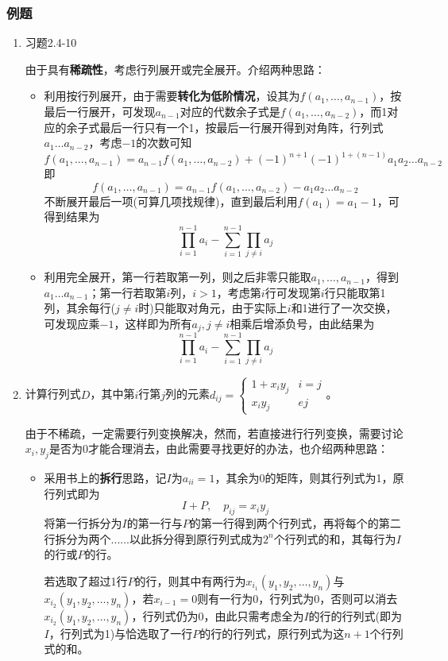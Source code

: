 \documentclass[a4paper,UTF8,fontset=windows]{ctexart}
\begin{document}
\subsubsection{例题}
\begin{enumerate}
    \item 习题2.4-10
    
    由于具有\textbf{稀疏性}，考虑行列展开或完全展开。介绍两种思路：
    \begin{itemize}
        \item 利用按行列展开，由于需要\textbf{转化为低阶情况}，设其为$f(a_1,\dots,a_{n-1})$，按最后一行展开，可发现$a_{n-1}$对应的代数余子式是$f(a_1,\dots,a_{n-2})$，而1对应的余子式最后一行只有一个1，按最后一行展开得到对角阵，行列式$a_1\dots a_{n-2}$，考虑$-1$的次数可知
        $$f(a_1,\dots,a_{n-1})=a_{n-1}f(a_1,\dots,a_{n-2})+(-1)^{n+1}(-1)^{1+(n-1)}a_1a_2\dots a_{n-2}$$
        即$$f(a_1,\dots,a_{n-1})=a_{n-1}f(a_1,\dots,a_{n-2})-a_1a_2\dots a_{n-2}$$
        不断展开最后一项(可算几项找规律)，直到最后利用$f(a_1)=a_1-1$，可得到结果为
        $$\prod_{i=1}^{n-1}a_i-\sum_{i=1}^{n-1}\prod_{j\ne i}a_j$$

        \item 利用完全展开，第一行若取第一列，则之后非零只能取$a_1,\dots,a_{n-1}$，得到$a_1\dots a_{n-1}$；第一行若取第$i$列，$i>1$，考虑第$i$行可发现第$i$行只能取第1列，其余每行($j\ne i$时)只能取对角元，由于实际上$i$和1进行了一次交换，可发现应乘$-1$，这样即为所有$a_j,j\ne i$相乘后增添负号，由此结果为
        $$\prod_{i=1}^{n-1}a_i-\sum_{i=1}^{n-1}\prod_{j\ne i}a_j$$
    \end{itemize}

    \item 计算行列式$D$，其中第$i$行第$j$列的元素$d_{ij}=\begin{cases}1+x_iy_j&i=j\\x_iy_j&e j\end{cases}$。
    
    由于不稀疏，一定需要行列变换解决，然而，若直接进行行列变换，需要讨论$x_i,y_j$是否为0才能合理消去，由此需要寻找更好的办法，也介绍两种思路：
    \begin{itemize}
        \item 采用书上的\textbf{拆行}思路，记$I$为$a_{ii}=1$，其余为0的矩阵，则其行列式为1，原行列式即为
        $$I+P,\quad p_{ij}=x_iy_j$$
        将第一行拆分为$I$的第一行与$P$的第一行得到两个行列式，再将每个的第二行拆分为两个......以此拆分得到原行列式成为$2^n$个行列式的和，其每行为$I$的行或$P$的行。

        若选取了超过1行$P$的行，则其中有两行为$x_{i_1}(y_1,y_2,\dots,y_n)$与$x_{i_2}(y_1,y_2,\dots,y_n)$，若$x_{i-1}=0$则有一行为0，行列式为0，否则可以消去$x_{i_2}(y_1,y_2,\dots,y_n)$，行列式仍为0，由此只需考虑全为$I$的行的行列式(即为$I$，行列式为1)与恰选取了一行$P$的行的行列式，原行列式为这$n+1$个行列式的和。


\end{itemize}
\end{enumerate}
\end{document}
